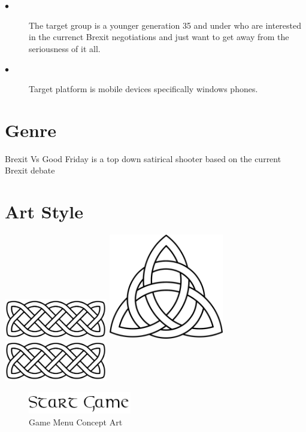 \documentclass[a4paper]{scrreprt}
\begin{document}
    \begin{description}
        \item[$\bullet$] The target group is a younger generation 35 and under who are interested in the currenct Brexit negotiations and just want to get away from the seriousness of it all.
        \item[$\bullet$] Target platform is mobile devices specifically windows phones.
    \end{description}

    \section{Genre}
    Brexit Vs Good Friday is a top down satirical shooter based on the current Brexit debate

    \section{Art Style}

    \centering
    \includegraphics[width=4.5cm]{celtic-knot}
    \includegraphics[width=5cm]{celtic-knot-arrow}
    \includegraphics[width=4.5cm]{celtic-knot}
    \begin{figure}[H]
        \centering
        \includegraphics[width=4.5cm]{start-game}
        \caption{\label{fig:art} Game Menu Concept Art}
    \end{figure}
\end{document}
